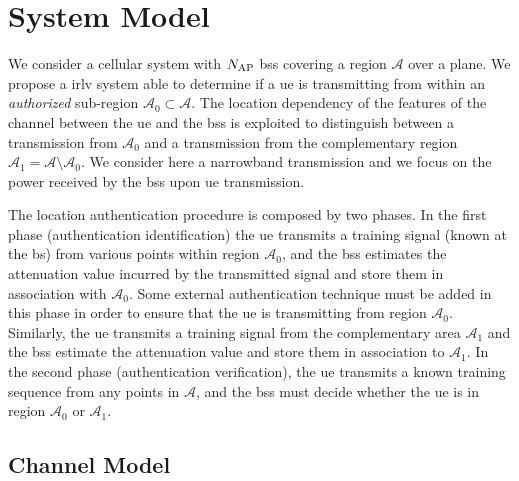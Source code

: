 \documentclass[conference]{IEEEtran}
\begin{document}
\section{System Model}\label{sec:sys model}


We consider a cellular system with $N_{\rm AP}$ \acp{bs} covering a region $\mathcal{A}$ over a plane. We propose a \ac{irlv} system able to determine if a \ac{ue} is transmitting from within an {\em authorized} sub-region $\mathcal{A}_0 \subset \mathcal{A}$. The location dependency of the features of the channel between the \ac{ue} and the \acp{bs} is exploited to distinguish between a transmission from $\mathcal{A}_0$ and a transmission from the complementary region $\mathcal{A}_1=\mathcal{A} \setminus \mathcal{A}_0$. We consider here a narrowband transmission and we focus on the power received by the \acp{bs} upon \ac{ue} transmission.

The location authentication procedure is composed by two phases. In the first phase (authentication identification) the \ac{ue} transmits a training signal (known at the \acs{bs}) from various points within region $\mathcal{A}_0$, and the \acp{bs} estimates the attenuation value incurred by the transmitted signal and store them in association with $\mathcal{A}_0$. Some external authentication technique must be added in this phase in order to ensure that the \ac{ue} is transmitting from region $\mathcal{A}_0$. Similarly, the \ac{ue} transmits a training signal from the complementary area $\mathcal{A}_1$ and the \acp{bs} estimate the attenuation value and store them in association to $\mathcal{A}_1$. In the second phase (authentication verification), the \ac{ue} transmits a known training sequence from any points in $\mathcal{A}$, and the \acp{bs} must decide whether the \ac{ue} is in region $\mathcal{A}_0$ or $\mathcal{A}_1$.


\subsection{Channel Model}
\end{document}
